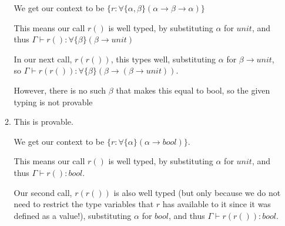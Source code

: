 \begin{enumerate}[label=(\alph*)]
\begin{enumerate}[label=(\roman*)]
                We get our context to be $\{r : \forall\{\alpha, \beta\}(\alpha \rightarrow \beta \rightarrow \alpha)\}$

                This means our call $r ()$ is well typed, by substituting $\alpha$ for $unit$, and thus $\Gamma \vdash r () : \forall \{\beta\}(\beta \rightarrow unit)$

                In our next call, $r (r ())$, this types well, substituting $\alpha$ for $\beta \rightarrow unit$, so $\Gamma \vdash r (r ()) : \forall \{\beta\}(\beta \rightarrow (\beta \rightarrow unit))$.

                However, there is no such $\beta$ that makes this equal to bool, so the given typing is not provable

            \item
                This is provable.

                We get our context to be $\{r : \forall \{\alpha\}(\alpha \rightarrow bool)\}$.

                This means our call $r ()$ is well typed, by substituting $\alpha$ for $unit$, and thus $\Gamma \vdash r () : bool$.

                Our second call, $r (r ())$ is also well typed (but only because we do not need to restrict the type variables that $r$ has available to it since it was defined as a value!), substituting $\alpha$ for $bool$, and thus $\Gamma \vdash r (r ()) : bool$.





        \end{enumerate}

        




        
    \end{enumerate}

